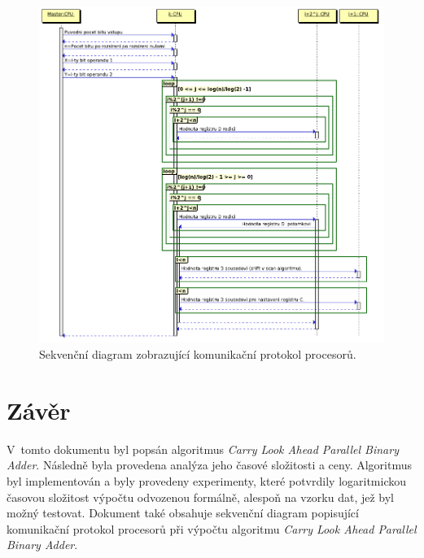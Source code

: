 \documentclass[a4paper, 12pt]{article}
\begin{document}
\begin{figure}[bt]
\begin{center}
    \includegraphics[scale=0.65]{seq.png}
    \caption{Sekvenční diagram zobrazující komunikační protokol procesorů.}
    \label{fig:seq}
\end{center}
\end{figure}

\section{Závěr}
V~tomto dokumentu byl popsán algoritmus \emph{Carry Look Ahead Parallel Binary Adder}.
Následně byla provedena analýza jeho časové složitosti a ceny.
Algoritmus byl implementován a byly provedeny experimenty,
které potvrdily logaritmickou časovou složitost výpočtu odvozenou formálně,
alespoň na vzorku dat, jež byl možný testovat.
Dokument také obsahuje sekvenční diagram popisující komunikační protokol procesorů
při výpočtu algoritmu \emph{Carry Look Ahead Parallel Binary Adder}.
\end{document}
